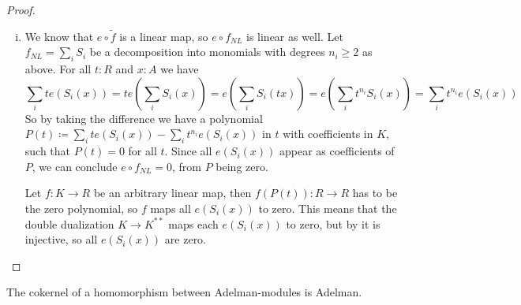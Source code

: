 \begin{proof}
\begin{enumerate}[(i)]
  Let $A$ and $C$ be given by $A=\Spec R[X_1,\dots,X_n]/(P_1,\dots,P_r)$ and $C=\Spec R[Y_1,\dots,Y_m]/(Q_1,\dots,Q_s)$.
  $\tilde{f}$ is represented by a homomorphism $\varphi$ between these $R$-algebras.
  Choosing lifts of the finitely many $\varphi(Y_i)$ we get polynomials $N_1,\dots,N_m$
  such that for all $j$ we have $Q_j(N_1,\dots,N_m)\in (P_1,\dots,P_r)$.
  Let $L_1,\dots,L_m$ be given by the linear parts of $N_1,\dots,N_m$.
  Then by analysing the degrees of the involved polynomials, we have $Q_j(L_1,\dots,L_m)\in (P_1,\dots,P_r)$, so the $L_1,\dots,L_m$ induce a homorphism
  \[
  \varphi_L: R[Y_1,\dots,Y_m]/(Q_1,\dots,Q_s) \to R[X_1,\dots,X_n]/(P_1,\dots,P_r)
  \]
  which induces a linear map $f_L:A\to C$.
  Let us note that the difference $f_{NL}\coloneq \tilde{f}-f_L$ is given by monomials $S_i$ which are all of degree at least two.
  \item We know that $e\circ \tilde{f}$ is a linear map, so $e\circ f_{NL}$ is linear as well.
  Let $f_{NL}=\sum_i S_i$ be a decomposition into monomials with degrees $n_i\geq 2$ as above.
  For all $t:R$ and $x:A$ we have
  \[
  \sum_i te(S_i(x))=te(\sum_i S_i(x))=e(\sum_i S_i(tx))=e(\sum_i t^{n_i}S_i(x))=\sum_i t^{n_i}e( S_i(x))
  \]
  So by taking the difference we have a polynomial $P(t)\coloneq \sum_i te(S_i(x))-\sum_i t^{n_i}e( S_i(x))$ in $t$ with coefficients in $K$, such that $P(t)=0$ for all $t$.
  Since all $e(S_i(x))$ appear as coefficients of $P$, we can conclude $e\circ f_{NL}=0$, from $P$ being zero.

  Let $f:K\to R$ be an arbitrary linear map, then $f(P(t)):R\to R$ has to be the zero polynomial,
  so $f$ maps all $e(S_i(x))$ to zero.
  This means that the double dualization $K\to K^{\ast\ast}$ maps each $e(S_i(x))$ to zero,
  but by  it is injective, so all $e(S_i(x))$ are zero.
  \end{enumerate}
\end{proof}

\begin{lemma}
  \label{coherent-kernels}
  The cokernel of a homomorphism between Adelman-modules is Adelman.
\end{lemma}

